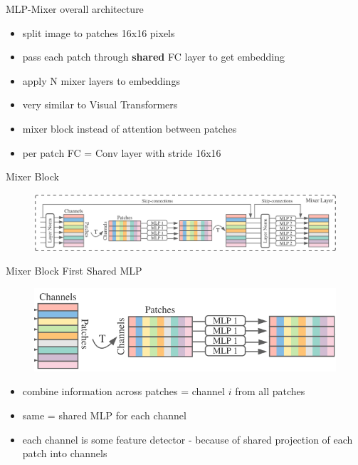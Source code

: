\documentclass{beamer}
\begin{document}
\begin{frame}{MLP-Mixer overall architecture}

\begin{itemize}
\item split image to patches 16x16 pixels
\item pass each patch through \textbf{shared} FC layer to get embedding
\item apply N mixer layers to embeddings
\end{itemize}
\vfill

\begin{itemize}
\item very similar to Visual Transformers
\item mixer block instead of attention between patches
\item per patch FC = Conv layer with stride 16x16 
\end{itemize}
\end{frame}
\begin{frame}{Mixer Block}

\begin{figure}[h]
\includegraphics[width=\textwidth]{img/mixer}
\end{figure}

\end{frame}
\begin{frame}{Mixer Block First Shared MLP}

\begin{figure}[h]
\includegraphics[width=\textwidth]{img/mlp1}
\end{figure}

\begin{itemize}
\item combine information across patches = channel $i$ from all patches
\item same = shared MLP for each channel
\item each channel is some feature detector - because of shared projection of each patch into channels
\end{itemize}

\end{frame}
\end{document}
